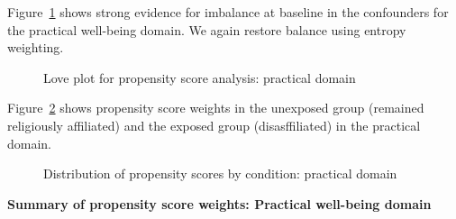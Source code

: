 \documentclass[
  singlecolumn,
  9pt]{article}
\begin{document}
Figure~\ref{fig-love-practical} shows strong evidence for imbalance at
baseline in the confounders for the practical well-being domain. We
again restore balance using entropy weighting.

\begin{figure}


\caption{\label{fig-love-practical}Love plot for propensity score
analysis: practical domain}

\end{figure}%

Figure~\ref{fig-propensity-dis-practical} shows propensity score weights
in the unexposed group (remained religiously affiliated) and the exposed
group (disasffiliated) in the practical domain.

\begin{figure}


\caption{\label{fig-propensity-dis-practical}Distribution of propensity
scores by condition: practical domain}

\end{figure}%

\textbf{Summary of propensity score weights: Practical well-being
domain}
\end{document}
